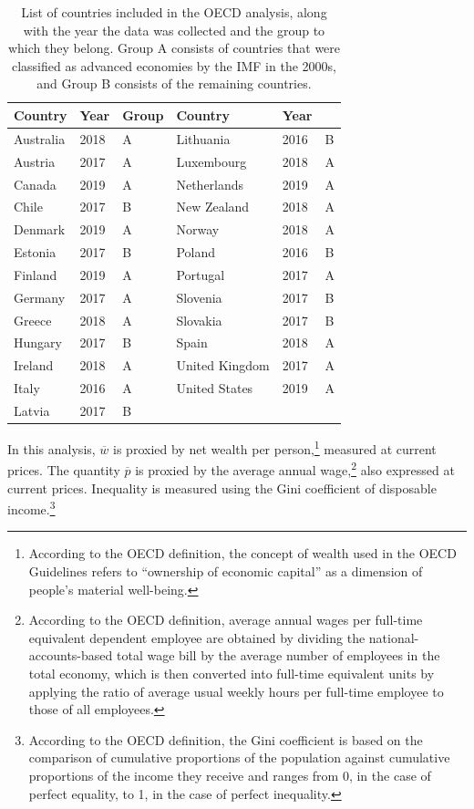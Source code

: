 \documentclass[12pt]{article}
\begin{document}
\begin{table}[]
\centering
\begin{tabular}{llllll}
Country & Year & \multicolumn{1}{l|}{Group} & Country & Year &  \\ \hline
Australia & 2018 & \multicolumn{1}{l|}{A} & Lithuania & 2016 & B\\
Austria & 2017 & \multicolumn{1}{l|}{A} & Luxembourg & 2018 & A\\
Canada & 2019 & \multicolumn{1}{l|}{A} & Netherlands & 2019 & A\\
Chile & 2017 & \multicolumn{1}{l|}{B} & New Zealand & 2018 & A\\
Denmark & 2019 & \multicolumn{1}{l|}{A} & Norway & 2018 & A\\
Estonia & 2017 & \multicolumn{1}{l|}{B} & Poland & 2016 & B\\
Finland & 2019 & \multicolumn{1}{l|}{A} & Portugal & 2017 & A\\
Germany & 2017 & \multicolumn{1}{l|}{A} & Slovenia & 2017 & B\\
Greece & 2018 & \multicolumn{1}{l|}{A} & Slovakia & 2017 & B\\
Hungary & 2017 & \multicolumn{1}{l|}{B} & Spain & 2018 & A\\
Ireland & 2018 & \multicolumn{1}{l|}{A} & United Kingdom & 2017 & A\\
Italy & 2016 & \multicolumn{1}{l|}{A} & United States & 2019 & A\\
Latvia & 2017 & \multicolumn{1}{l|}{B} &  &  & 
\end{tabular}
\caption{List of countries included in the OECD analysis, along with the year the data was collected and the group to which they belong. Group A consists of countries that were classified as advanced economies by the IMF in the 2000s, and Group B consists of the remaining countries.}
\label{tab:OECD}
\end{table}

In this analysis, $\overline{w}$ is proxied by net wealth per person,\footnote{According to the OECD definition, the concept of wealth used in the OECD Guidelines refers to ``ownership of economic capital'' as a dimension of people's material well-being.} measured at current prices.
%
The quantity $\overline{p}$ is proxied by the average annual wage,\footnote{According to the OECD definition, average annual wages per full-time equivalent dependent employee are obtained by dividing the national-accounts-based total wage bill by the average number of employees in the total economy, which is then converted into full-time equivalent units by applying the ratio of average usual weekly hours per full-time employee to those of all employees.} also expressed at current prices. Inequality is measured using the Gini coefficient of disposable income.\footnote{According to the OECD definition, the Gini coefficient is based on the comparison of cumulative proportions of the population against cumulative proportions of the income they receive and ranges from 0, in the case of perfect equality, to 1, in the case of perfect inequality.}
\end{document}
